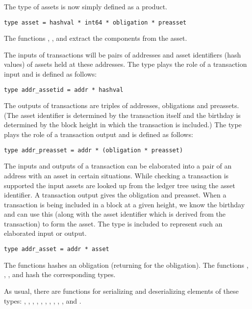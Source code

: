 The type {} of assets is now simply defined as a product.
\begin{verbatim}
type asset = hashval * int64 * obligation * preasset
\end{verbatim}
The functions {}, {},
{} and {}
extract the components from the asset.

The inputs of transactions will be pairs of addresses and asset identifiers (hash values)
of assets held at these addresses. The type {}
plays the role of a transaction input and is defined as follows:
\begin{verbatim}
type addr_assetid = addr * hashval
\end{verbatim}
The outputs of transactions are triples of addresses, obligations and preassets.
(The asset identifier is determined by the transaction itself and the birthday
is determined by the block height in which the transaction is included.)
The type {} plays the role of a transaction output and is defined as follows:
\begin{verbatim}
type addr_preasset = addr * (obligation * preasset)
\end{verbatim}
The inputs and outputs of a transaction can be elaborated into a pair of an address with an asset
in certain situations.
While checking a transaction is supported the input assets are looked up from the ledger tree
using the asset identifier. 
A transaction output gives the obligation and preasset.
When a transaction is being included in a block at a given height,
we know the birthday and can use this (along with the asset identifier which 
is derived from the transaction) to form the asset.
The type {} is included to represent such an elaborated input or output.
\begin{verbatim}
type addr_asset = addr * asset
\end{verbatim}

The functions {} hashes an obligation (returning {}
for the {} obligation).
The functions {},
{},
{},
{} and
{}
hash the corresponding types.

As usual, there are functions for serializing and deserializing elements of these types:
{},
{},
{},
{},
{},
{},
{},
{},
{},
{},
{}
and
{}.

